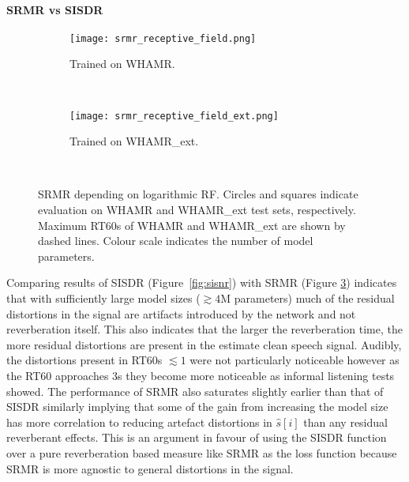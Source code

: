 \documentclass[conference,a4paper]{IEEEtran}
\begin{document}
\paragraph{\ac{SRMR} vs \ac{SISDR}}
\begin{figure}[h]
    \centering
    \begin{subfigure}{\columnwidth}
        \centering
        \texttt{[image: srmr\_receptive\_field.png]}\\[-1.5ex]
        \caption{ Trained on WHAMR.}
         \label{fig:srmr:a}
    \end{subfigure}\\[-0.5ex]
    \begin{subfigure}{\columnwidth}
        \centering
        \texttt{[image: srmr\_receptive\_field\_ext.png]}\\[-1.5ex]
        \caption{ Trained on WHAMR\_ext.}
         \label{fig:srmr:b}
    \end{subfigure}\\[-0.5ex]
    \caption{SRMR depending on logarithmic \ac{RF}. Circles and squares indicate evaluation on WHAMR and WHAMR\_ext test sets, respectively. Maximum RT60s of WHAMR and WHAMR\_ext are shown by dashed lines. Colour scale indicates the number of model parameters.}
    \label{fig:srmr}
\end{figure}
Comparing results of \ac{SISDR} (Figure~\ref{fig:sisnr}) with \ac{SRMR} (Figure \ref{fig:srmr}) indicates that with sufficiently large model sizes ($\gtrsim4$M parameters) much of the residual distortions in the signal are artifacts introduced by the network and not reverberation itself. This also indicates that the larger the reverberation time, the more residual distortions are present in the estimate clean speech signal. Audibly, the distortions present in RT60s $\lesssim1$ were not particularly noticeable however as the RT60 approaches 3s they become more noticeable as informal listening tests showed. The performance of \ac{SRMR} also saturates slightly earlier than that of \ac{SISDR} similarly implying that some of the gain from increasing the model size has more correlation to reducing artefact distortions in $\hat{s}[i]$ than any residual reverberant effects.
This is an argument in favour of using the \ac{SISDR} function over a pure reverberation based measure like \ac{SRMR} as the loss function because \ac{SRMR} is more agnostic to general distortions in the signal.
\end{document}
